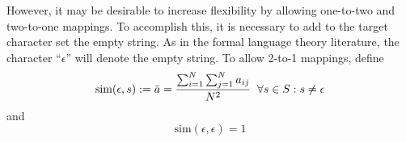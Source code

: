 \iffalse
The first enhancement is to use bidirectional conditioning:
$$f_2(s^{(n)}_i) = t^{(n)}_i = \arg \max_{t_l \in T}  \alpha \cdot p(t_l|t_{l-1}) + 
\beta \cdot p(t_l|t_{l+1}) + 
\textrm{sim}(t_l, s^{(n)}_i).$$
This bidirectional approach is more robust to cases where the true mapping is non-injective,
but the function to be learned is injective. 
\fi

However, it may be desirable to increase flexibility by allowing one-to-two and two-to-one mappings.
To accomplish this, it is necessary to add to the target character set the empty string. 
As in the formal language theory literature, the character ``$\epsilon$'' will denote 
the empty string.
To allow 2-to-1 mappings, define 
$$\textrm{sim}(\epsilon, s) := \bar{a} = \frac{\sum_{i=1}^N \sum_{j=1}^N a_{ij}}{N^2} 
\hphantom{..} \forall s \in S: s \neq \epsilon$$
and $$\textrm{sim}(\epsilon, \epsilon) = 1$$


\iffalse
Define the $\epsilon$-padded sequence as follows:
$$S^{(n)}_\epsilon = \left<\textrm{start}\right>, \epsilon, s^{(n)}_1, \epsilon, s^{(n)}_2, \epsilon, 
s^{(n)}_3, \epsilon, ..., \epsilon, s^{(n)}_{L}, \epsilon, \left<\textrm{stop}\right>$$
Moreover, define sim$(\epsilon_i, s_j) := \textrm{sim}(s_{i-1}, s_j) \hphantom{.} \forall s_j \neq \epsilon$ and $\textrm{sim}(\epsilon, \epsilon) = 1$.
\fi

